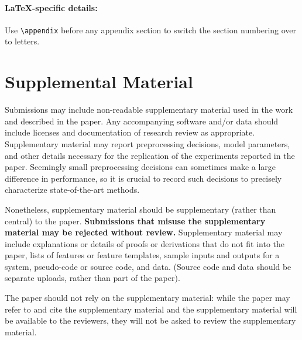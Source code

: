 \documentclass[11pt,a4paper]{article}
\begin{document}
\paragraph{\LaTeX-specific details:}
Use {\small\verb|\appendix|} before any appendix section to switch the section numbering over to letters.


\section{Supplemental Material}
\label{sec:supplemental}
Submissions may include non-readable supplementary material used in the work and described in the paper.
Any accompanying software and/or data should include licenses and documentation of research review as appropriate.
Supplementary material may report preprocessing decisions, model parameters, and other details necessary for the replication of the experiments reported in the paper.
Seemingly small preprocessing decisions can sometimes make a large difference in performance, so it is crucial to record such decisions to precisely characterize state-of-the-art methods. 

Nonetheless, supplementary material should be supplementary (rather than central) to the paper.
\textbf{Submissions that misuse the supplementary material may be rejected without review.}
Supplementary material may include explanations or details of proofs or derivations that do not fit into the paper, lists of
features or feature templates, sample inputs and outputs for a system, pseudo-code or source code, and data.
(Source code and data should be separate uploads, rather than part of the paper).

The paper should not rely on the supplementary material: while the paper may refer to and cite the supplementary material and the supplementary material will be available to the reviewers, they will not be asked to review the supplementary material.
\end{document}
